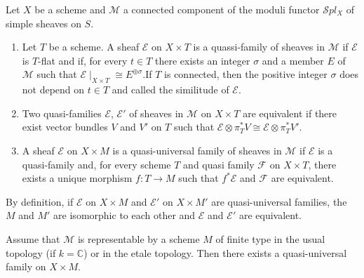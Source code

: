 Let $X$ be a scheme and $\mathscr{M}$ a connected component of the
moduli functor $\mathscr{S}pl_X$ of simple sheaves on $S$. 

\setcounter{dfnn}{3}
\begin{dfnn}\label{dfnn4}
\begin{enumerate}
\renewcommand{\labelenumi}{(\theenumi)}
\item Let $T$ be a scheme. A sheaf $\mathscr{E}$ on $X\times T$ is a
quassi-family of sheaves in $\mathscr{M}$ if $\mathscr{E}$ is $T$-flat
and if, for every $t\in T$ there exists an integer $\sigma$ and a
member $E$ of $\mathscr{M}$ such that $\mathscr{E}\mid_{X\times
T}\cong E^{\oplus \sigma}$.\pageoriginale If $T$ is connected, then the positive
integer $\sigma$ does not depend on $t\in T$ and called the similitude
of $\mathscr{E}$. 
\item Two quasi-families $\mathscr{E}$, $\mathscr{E}'$ of sheaves in
$\mathscr{M}$ on $X\times T$ are equivalent if there exist vector
bundles $V$ and $V'$ on $T$ such that
$\mathscr{E}\otimes \pi^{\ast}_TV\cong \mathscr{E}\otimes \pi^{\ast}_TV'$. 
\item A sheaf $\mathscr{E}$ on $X\times M$ is a quasi-universal family
of sheaves in $\mathscr{M}$ if $\mathscr{E}$ is a quasi-family and,
for every scheme $T$ and quasi family $\mathscr{F}$ on $X\times T$,
there exists a unique morphism $f:T\to M$ such that
$f^{\ast}\mathscr{E}$ and $\mathscr{F}$ are equivalent. 
\end{enumerate}
\end{dfnn}

By definition, if $\mathscr{E}$ on $X\times M$ and $\mathscr{E'}$ on
$X\times M'$ are quasi-universal families, the  $M$ and $M'$ are
isomorphic to each other and $\mathscr{E}$ and $\mathscr{E'}$ are
equivalent. 

\setcounter{Thm}{4}
\begin{Thm}\label{Thm5}
Assume that $\mathscr{M}$ is representable by a scheme $M$ of finite
type in the usual topology (if $k=\mathbb{C}$) or in the etale
topology. Then there exists a quasi-universal family on $X\times M$. 
\end{Thm}

